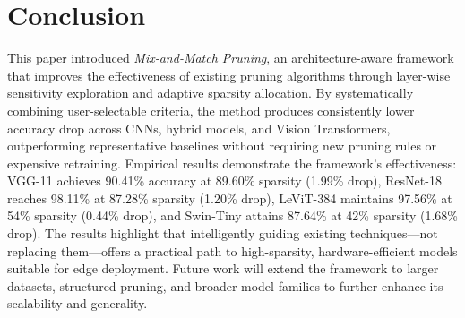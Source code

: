 \documentclass[11pt, conference]{IEEEtran}
\begin{document}
\FloatBarrier
\section{Conclusion}
\label{sec:conclusion}
This paper introduced \textit{Mix-and-Match Pruning}, an architecture-aware framework that improves the effectiveness of existing pruning algorithms through layer-wise sensitivity exploration and adaptive sparsity allocation. By systematically combining user-selectable criteria, the method produces consistently lower accuracy drop across CNNs, hybrid models, and Vision Transformers, outperforming representative baselines without requiring new pruning rules or expensive retraining. Empirical results demonstrate the framework's effectiveness: VGG-11 achieves 90.41\% accuracy at 89.60\% sparsity (1.99\% drop), ResNet-18 reaches 98.11\% at 87.28\% sparsity (1.20\% drop), LeViT-384 maintains 97.56\% at 54\% sparsity (0.44\% drop), and Swin-Tiny attains 87.64\% at 42\% sparsity (1.68\% drop). The results highlight that intelligently guiding existing techniques—not replacing them—offers a practical path to high-sparsity, hardware-efficient models suitable for edge deployment. Future work will extend the framework to larger datasets, structured pruning, and broader model families to further enhance its scalability and generality.
\end{document}
